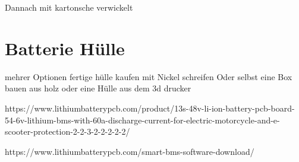 Dannach mit kartonsche verwickelt
\section{Batterie Hülle}
mehrer Optionen fertige hülle kaufen mit Nickel schreifen 
Oder selbst eine Box bauen aus holz oder 
eine Hülle aus dem 3d drucker



https://www.lithiumbatterypcb.com/product/13s-48v-li-ion-battery-pcb-board-54-6v-lithium-bms-with-60a-discharge-current-for-electric-motorcycle-and-e-scooter-protection-2-2-3-2-2-2-2-2/


https://www.lithiumbatterypcb.com/smart-bms-software-download/


